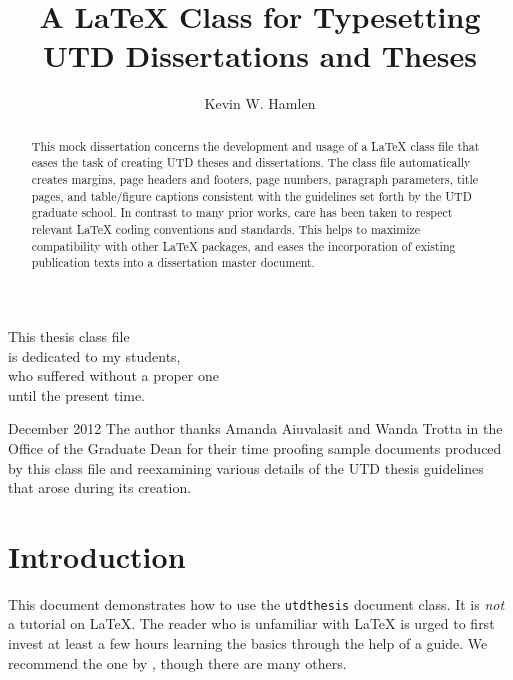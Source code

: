 \documentclass[doublespacing]{utdthesis}
\author{Kevin W. Hamlen}
\title{A LaTeX Class for Typesetting \\ UTD Dissertations and Theses}
\begin{document}
\frontmatter

\signaturepage


\begin{dedication} %
This thesis class file \\
is dedicated to my students, \\
who suffered without a proper one \\
until the present time.
\end{dedication}

\maketitle

\begin{acks}{December 2012} %
The author thanks Amanda Aiuvalasit and Wanda Trotta in the Office of the
Graduate Dean for their time proofing sample documents produced by this
class file and reexamining various details of the UTD thesis guidelines
that arose during its creation.
\end{acks}

\begin{abstract}
This mock dissertation concerns the development and usage of a \LaTeX{}
class file that eases the task of creating UTD theses and dissertations.
The class file automatically creates margins, page headers and footers, page
numbers, paragraph parameters, title pages, and table/figure captions
consistent with the guidelines set forth by the UTD graduate school.
In contrast to many prior works, care has been taken to respect relevant
\LaTeX{} coding conventions and standards.
This helps to maximize compatibility with other \LaTeX{} packages, and
eases the incorporation of existing publication texts into a dissertation
master document.
\end{abstract}

\tableofcontents
\listoffigures %
\listoftables %

\mainmatter

\chapter{Introduction}
\label{c:intro}

This document demonstrates how to use the \texttt{utdthesis} document class.
It is \emph{not} a tutorial on \LaTeX.
The reader who is unfamiliar with \LaTeX{} is urged to first invest at least
a few hours learning the basics through the help of a guide.
We recommend the one by \citet{oetiker}, though there are many others.
\end{document}
